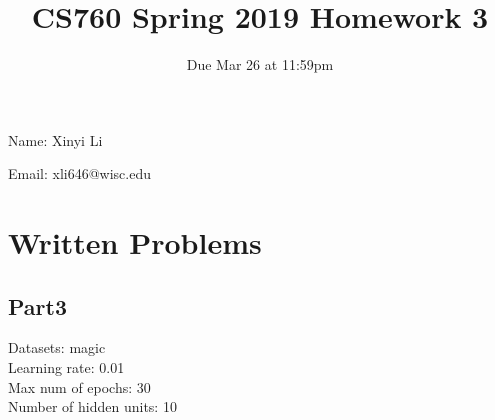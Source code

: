 \documentclass{article}
\title{CS760 Spring 2019 Homework 3}
\author{Due Mar 26 at 11:59pm}
\date{}
\begin{document}
\maketitle



Name: Xinyi Li 

Email: xli646@wisc.edu



\section*{Written Problems}
\subsection*{Part3}
Datasets: magic\\
Learning rate: 0.01\\
Max num of epochs: 30\\
Number of hidden units: 10\\
\end{document}
